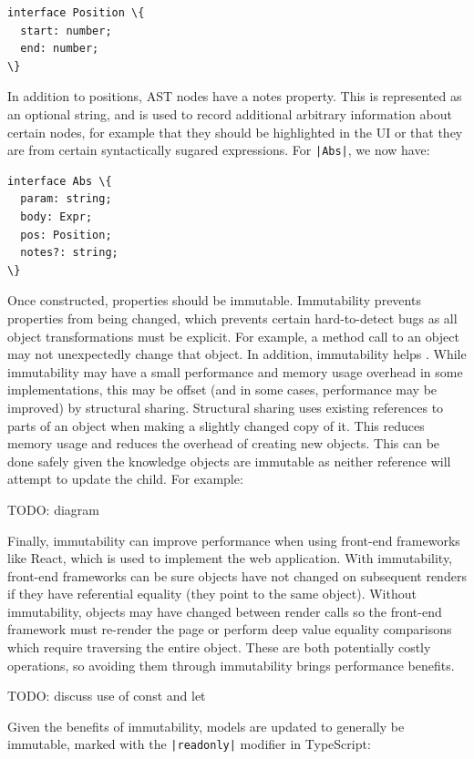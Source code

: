 \documentclass[a4paper,fleqn,12pt]{article}
\begin{document}
\begin{verbatim}
interface Position \{
  start: number;
  end: number;
\}
\end{verbatim}

In addition to positions, AST nodes have a notes property. This is represented as an optional string, and is used to record additional arbitrary information about certain nodes, for example that they should be highlighted in the UI or that they are from certain syntactically sugared expressions. For \texttt{|Abs|}, we now have:

\begin{verbatim}
interface Abs \{
  param: string;
  body: Expr;
  pos: Position;
  notes?: string;
\}
\end{verbatim}

Once constructed, properties should be immutable. Immutability prevents properties from being changed, which prevents certain hard-to-detect bugs as all object transformations must be explicit. For example, a method call to an object may not unexpectedly change that object. In addition, immutability helps . While immutability may have a small performance and memory usage overhead in some implementations, this may be offset (and in some cases, performance may be improved) by structural sharing. Structural sharing uses existing references to parts of an object when making a slightly changed copy of it. This reduces memory usage and reduces the overhead of creating new objects. This can be done safely given the knowledge objects are immutable as neither reference will attempt to update the child. For example:

TODO: diagram

Finally, immutability can improve performance when using front-end frameworks like React, which is used to implement the web application. With immutability, front-end frameworks can be sure objects have not changed on subsequent renders if they have referential equality (they point to the same object). Without immutability, objects may have changed between render calls so the front-end framework must re-render the page or perform deep value equality comparisons which require traversing the entire object. These are both potentially costly operations, so avoiding them through immutability brings performance benefits.

TODO: discuss use of const and let

Given the benefits of immutability, models are updated to generally be immutable, marked with the \texttt{|readonly|} modifier in TypeScript:
\end{document}
